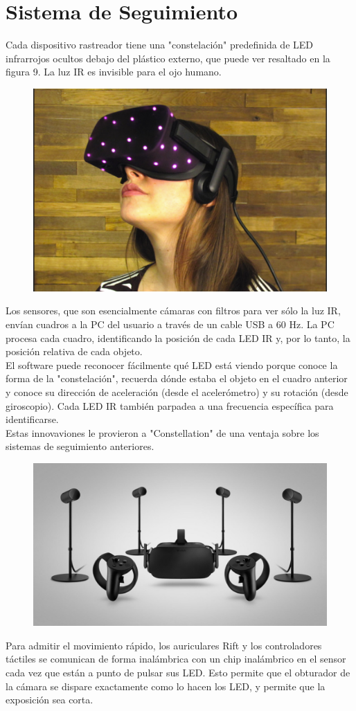 \section{Sistema de Seguimiento}
Cada dispositivo rastreador tiene una "constelación" predefinida de LED infrarrojos ocultos debajo del plástico externo, que puede ver resaltado en la figura 9. La luz IR es invisible para el ojo humano.\\
\begin{figure}[H]
	\begin{center}
 		\includegraphics[width = .5\textwidth]{source/images/image55.png}
	\end{center} 
\end{figure}
Los sensores, que son esencialmente cámaras con filtros para ver sólo la luz IR, envían cuadros a la PC del usuario a través de un cable USB a 60 Hz. La PC procesa cada cuadro, identificando la posición de cada LED IR y, por lo tanto, la posición relativa de cada objeto.\\
El software puede reconocer fácilmente qué LED está viendo porque conoce la forma de la "constelación", recuerda dónde estaba el objeto en el cuadro anterior y conoce su dirección de aceleración (desde el acelerómetro) y su rotación (desde giroscopio). Cada LED IR también parpadea a una frecuencia específica para identificarse.\\
Estas innovaviones le provieron a "Constellation" de una ventaja sobre los sistemas de seguimiento anteriores.\\
\begin{figure}[H]
	\begin{center}
 		\includegraphics[width = .5\textwidth]{source/images/image15.png}
	\end{center} 
\end{figure}
Para admitir el movimiento rápido, los auriculares Rift y los controladores táctiles se comunican de forma inalámbrica con un chip inalámbrico en el sensor cada vez que están a punto de pulsar sus LED. Esto permite que el obturador de la cámara se dispare exactamente como lo hacen los LED, y permite que la exposición sea corta.\\

